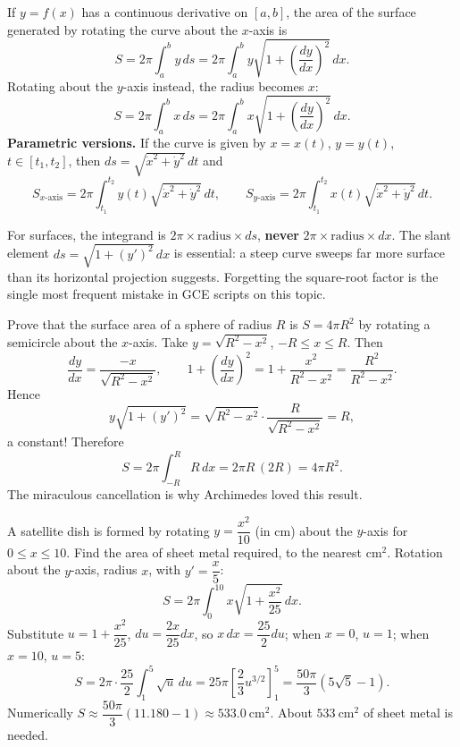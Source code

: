 \documentclass[11pt]{article}
\begin{document}
\begin{propriete}
If $y=f(x)$ has a continuous derivative on $[a,b]$, the area of the surface generated by rotating the curve about the $x$-axis is
\[ \boxed{S=2\pi\int_{a}^{b} y\,ds=2\pi\int_{a}^{b} y\sqrt{1+\left(\frac{dy}{dx}\right)^{2}}\,dx.} \]
Rotating about the $y$-axis instead, the radius becomes $x$:
\[ S=2\pi\int_{a}^{b} x\,ds=2\pi\int_{a}^{b} x\sqrt{1+\left(\frac{dy}{dx}\right)^{2}}\,dx. \]
\textbf{Parametric versions.} If the curve is given by $x=x(t)$, $y=y(t)$, $t\in[t_{1},t_{2}]$, then $ds=\sqrt{\dot{x}^{2}+\dot{y}^{2}}\,dt$ and
\[ S_{x\text{-axis}}=2\pi\int_{t_{1}}^{t_{2}} y(t)\sqrt{\dot{x}^{2}+\dot{y}^{2}}\,dt,\qquad
S_{y\text{-axis}}=2\pi\int_{t_{1}}^{t_{2}} x(t)\sqrt{\dot{x}^{2}+\dot{y}^{2}}\,dt. \]
\end{propriete}

\begin{attention}
For surfaces, the integrand is $2\pi\times\text{radius}\times ds$, \textbf{never} $2\pi\times\text{radius}\times dx$. The slant element $ds=\sqrt{1+(y')^{2}}\,dx$ is essential: a steep curve sweeps far more surface than its horizontal projection suggests. Forgetting the square-root factor is the single most frequent mistake in GCE scripts on this topic.
\end{attention}

\begin{exoresolu}
Prove that the surface area of a sphere of radius $R$ is $S=4\pi R^{2}$ by rotating a semicircle about the $x$-axis.
\tcblower
Take $y=\sqrt{R^{2}-x^{2}}$, $-R\le x\le R$. Then
\[ \frac{dy}{dx}=\frac{-x}{\sqrt{R^{2}-x^{2}}},\qquad
1+\left(\frac{dy}{dx}\right)^{2}=1+\frac{x^{2}}{R^{2}-x^{2}}=\frac{R^{2}}{R^{2}-x^{2}}. \]
Hence
\[ y\sqrt{1+(y')^{2}}=\sqrt{R^{2}-x^{2}}\cdot\frac{R}{\sqrt{R^{2}-x^{2}}}=R, \]
a constant! Therefore
\[ S=2\pi\int_{-R}^{R}R\,dx=2\pi R\,(2R)=4\pi R^{2}. \]
The miraculous cancellation is why Archimedes loved this result.
\end{exoresolu}

\begin{exoresolu}
A satellite dish is formed by rotating $y=\dfrac{x^{2}}{10}$ (in cm) about the $y$-axis for $0\le x\le 10$. Find the area of sheet metal required, to the nearest $\mathrm{cm^{2}}$.
\tcblower
Rotation about the $y$-axis, radius $x$, with $y'=\dfrac{x}{5}$:
\[ S=2\pi\int_{0}^{10}x\sqrt{1+\frac{x^{2}}{25}}\,dx. \]
Substitute $u=1+\dfrac{x^{2}}{25}$, $du=\dfrac{2x}{25}dx$, so $x\,dx=\dfrac{25}{2}du$; when $x=0$, $u=1$; when $x=10$, $u=5$:
\[ S=2\pi\cdot\frac{25}{2}\int_{1}^{5}\sqrt{u}\,du=25\pi\left[\frac{2}{3}u^{3/2}\right]_{1}^{5}
=\frac{50\pi}{3}\left(5\sqrt{5}-1\right). \]
Numerically $S\approx \dfrac{50\pi}{3}(11.180-1)\approx 533.0\ \mathrm{cm^{2}}$. About $533\ \mathrm{cm^{2}}$ of sheet metal is needed.
\end{exoresolu}
\end{document}
